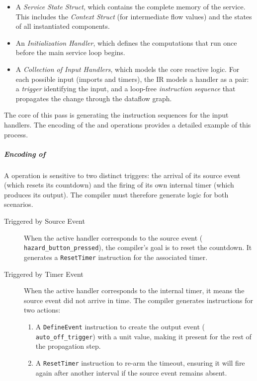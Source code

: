\begin{enumerate}
\begin{itemize}
              \item A \emph{Service State Struct}, which contains the complete memory of the service.
                    This includes the \emph{Context Struct} (for intermediate flow values) and the
                    states of all instantiated \GRSync components.

              \item An \emph{Initialization Handler}, which defines the computations that run once
                    before the main service loop begins.

              \item A \emph{Collection of Input Handlers}, which models the core reactive logic.
                    For each possible input (imports and timers), the IR models a handler as a pair:
                    a \emph{trigger} identifying the input, and a loop-free \emph{instruction
                        sequence} that propagates the change through the dataflow graph.
          \end{itemize}
          The core of this pass is generating the instruction sequences for the input handlers.
          The encoding of the  and  operations provides a detailed
          example of this process.

          \subparagraph{Encoding of }
          A  operation is sensitive to two distinct triggers: the arrival of its
          source event (which resets its countdown) and the firing of its own internal timer (which
          produces its output). The compiler must therefore generate logic for both scenarios.
          \begin{description}
              \item[Triggered by Source Event]
                    When the active handler corresponds to the source event (\eg
                    \texttt{hazard\_button\_pressed}), the compiler's goal is to reset the
                    countdown. It generates a \texttt{ResetTimer} instruction for the associated
                    timer.

              \item[Triggered by Timer Event]
                    When the active handler corresponds to the internal timer, it means the source
                    event did not arrive in time. The compiler generates instructions for two
                    actions:
                    \begin{enumerate}
                        \item A \texttt{DefineEvent} instruction to create the output event (\eg
                              \texttt{auto\_off\_trigger}) with a unit value, making it present for
                              the rest of the propagation step.
                        \item A \texttt{ResetTimer} instruction to re-arm the timeout, ensuring it
                              will fire again after another interval if the source event remains
                              absent.
                    \end{enumerate}


\end{description}
\end{enumerate}
